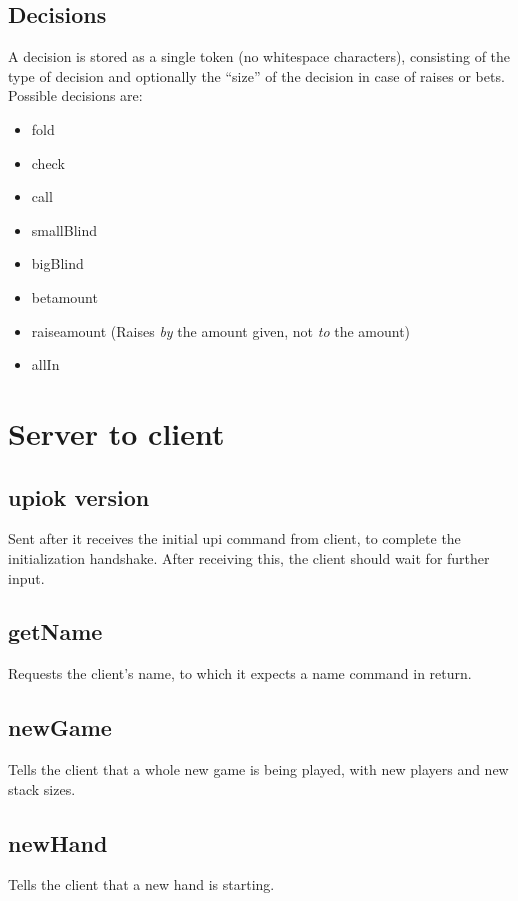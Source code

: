 \documentclass{article}
\begin{document}
\subsection*{Decisions}
A decision is stored as a single token (no whitespace characters), consisting of the type of decision and optionally the ``size'' of the decision in case of raises or bets. Possible decisions are:

\begin{itemize}
\item fold
\item check
\item call
\item smallBlind
\item bigBlind
\item bet\textlangle{}amount\textrangle{} 
\item raise\textlangle{}amount\textrangle{} (Raises \textit{by} the amount given, not \textit{to} the amount)
\item allIn
\end{itemize}

\section{Server to client}

\subsection*{upiok \textlangle{}version\textrangle{}}
Sent after it receives the initial upi command from client, to complete the initialization handshake. After receiving this, the client should wait for further input.

\subsection*{getName}
Requests the client's name, to which it expects a name command in return.

\subsection*{newGame}
Tells the client that a whole new game is being played, with new players and new stack sizes. 

\subsection*{newHand}
Tells the client that a new hand is starting.
\end{document}
